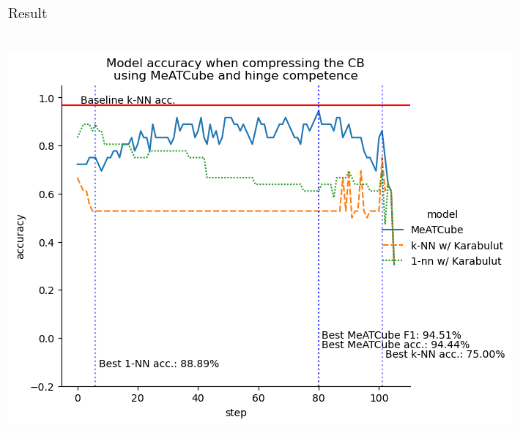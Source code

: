 \documentclass[]{beamer}
\begin{document}
\begin{frame}{Result}
\begin{columns}
\begin{column}{.65\textwidth}
            \includegraphics[width=.8\textwidth]{../results-weight-estim+/figs/wine}
        \end{column}
    \end{columns}
\end{frame}
\end{document}
